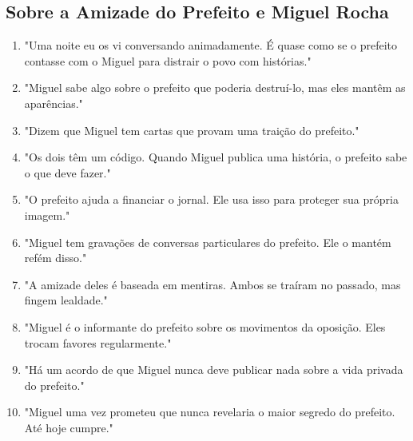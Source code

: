 \subsection*{Sobre a Amizade do Prefeito e Miguel Rocha}
\begin{enumerate}
    \item "Uma noite eu os vi conversando animadamente. É quase como se o prefeito contasse com o Miguel para distrair o povo com histórias."
    \item "Miguel sabe algo sobre o prefeito que poderia destruí-lo, mas eles mantêm as aparências."
    \item "Dizem que Miguel tem cartas que provam uma traição do prefeito."
    \item "Os dois têm um código. Quando Miguel publica uma história, o prefeito sabe o que deve fazer."
    \item "O prefeito ajuda a financiar o jornal. Ele usa isso para proteger sua própria imagem."
    \item "Miguel tem gravações de conversas particulares do prefeito. Ele o mantém refém disso."
    \item "A amizade deles é baseada em mentiras. Ambos se traíram no passado, mas fingem lealdade."
    \item "Miguel é o informante do prefeito sobre os movimentos da oposição. Eles trocam favores regularmente."
    \item "Há um acordo de que Miguel nunca deve publicar nada sobre a vida privada do prefeito."
    \item "Miguel uma vez prometeu que nunca revelaria o maior segredo do prefeito. Até hoje cumpre."
\end{enumerate}

